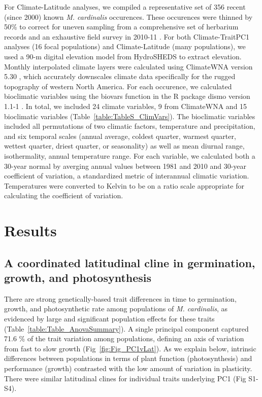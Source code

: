 \documentclass[11pt, oneside]{article}
\newcommand{\pkg}[1]{{\fontseries{b}\selectfont #1}}
\begin{document}
For Climate-Latitude analyses, we compiled a representative set of 356 recent (since 2000) known \textit{M. cardinalis} occurences. These occurences were thinned by 50\% to correct for uneven sampling from a comprehensive set of herbarium records and an exhaustive field survey in 2010-11 \citep{Angert_ENM}. For both Climate-TraitPC1 analyses (16 focal populations) and Climate-Latitude (many populations), we used a 90-m digital elevation model from HydroSHEDS \citep{Lehner_etal_2006} to extract elevation. Monthly interpolated climate layers were calculated using ClimateWNA version 5.30 \citep{Wang_etal_2012}, which accurately downscales climate data specifically for the rugged topography of western North America. For each occurence, we calculated bioclimatic variables using the biovars function in the R package \pkg{dismo} version 1.1-1 \citep{Hijmans_etal_2016}. In total, we included 24 climate variables, 9 from ClimateWNA and 15 bioclimatic variables (Table~\ref{table:TableS_ClimVars}). The bioclimatic variables included all permutations of two climatic factors, temperature and precipitation, and six temporal scales (annual average, coldest quarter, warmest quarter, wettest quarter, driest quarter, or seasonality) as well as mean diurnal range, isothermality, annual temperature range. For each variable, we calculated both a 30-year normal by averging annual values between 1981 and 2010 and 30-year coefficient of variation, a standardized metric of interannual climatic variation. Temperatures were converted to Kelvin to be on a ratio scale appropriate for calculating the coefficient of variation. 


\section*{Results}

\subsection*{A coordinated latitudinal cline in germination, growth, and photosynthesis}

There are strong genetically-based trait differences in time to germination, growth, and photosynthetic rate among populations of \textit{M. cardinalis}, as evidenced by large and significant population effects for these traits (Table~\ref{table:Table_AnovaSummary}). A single principal component captured 71.6 \% of the trait variation among populations, defining an axis of variation from fast to slow growth (Fig~\ref{fig:Fig_PC1vLat}). As we explain below, intrinsic differences between populations in terms of plant function (photosynthesis) and performance (growth) contrasted with the low amount of variation in plasticity. There were similar latitudinal clines for individual traits underlying PC1 (Fig S1-S4).
\end{document}
